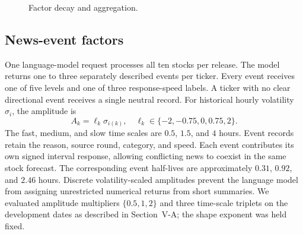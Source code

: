\documentclass[conference]{IEEEtran}
\begin{document}
\begin{figure}[t]
\caption{Factor decay and aggregation.}
\label{fig:factor_decay}
\end{figure}

\subsection{News-event factors}
One language-model request processes all ten stocks per release. The model returns one to three separately described events per ticker. Every event receives one of five levels and one of three response-speed labels. A ticker with no clear directional event receives a single neutral record. For historical hourly volatility $\sigma_i$, the amplitude is
\begin{equation}
 A_k=\ell_k\sigma_{i(k)},\quad
 \ell_k\in\{-2,-0.75,0,0.75,2\}.
\end{equation}
The fast, medium, and slow time scales are $0.5$, $1.5$, and $4$ hours. Event records retain the reason, source round, category, and speed. Each event contributes its own signed interval response, allowing conflicting news to coexist in the same stock forecast.
The corresponding event half-lives are approximately $0.31$, $0.92$, and $2.46$ hours. Discrete volatility-scaled amplitudes prevent the language model from assigning unrestricted numerical returns from short summaries. We evaluated amplitude multipliers $\{0.5,1,2\}$ and three time-scale triplets on the development dates as described in Section~V-A; the shape exponent was held fixed.
\end{document}
